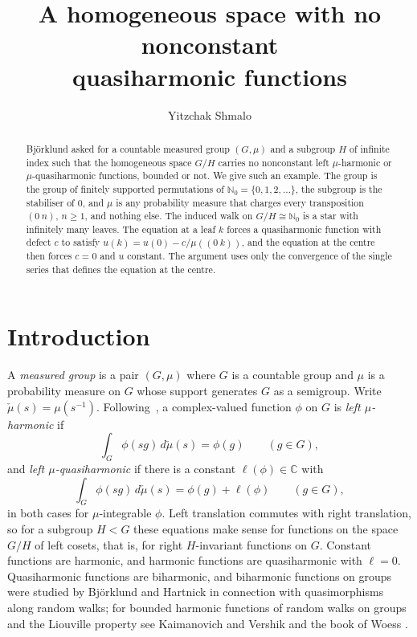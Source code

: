 \documentclass[11pt]{amsart}
\title[No nonconstant quasiharmonic functions on a homogeneous space]{A homogeneous space with no nonconstant\\ quasiharmonic functions}
\author{Yitzchak Shmalo}
\theoremstyle{definition}
\theoremstyle{remark}
\newcommand{\N}{\mathbb N}
\newcommand{\C}{\mathbb C}
\begin{document}
\begin{abstract}
Bj\"orklund asked for a countable measured group $(G,\mu)$ and a subgroup $H$ of infinite index such that the homogeneous space $G/H$ carries no nonconstant left $\mu$-harmonic or $\mu$-quasiharmonic functions, bounded or not. We give such an example. The group is the group of finitely supported permutations of $\N_0=\{0,1,2,\dots\}$, the subgroup is the stabiliser of $0$, and $\mu$ is any probability measure that charges every transposition $(0\ n)$, $n\ge1$, and nothing else. The induced walk on $G/H\cong\N_0$ is a star with infinitely many leaves. The equation at a leaf $k$ forces a quasiharmonic function with defect $c$ to satisfy $u(k)=u(0)-c/\mu((0\ k))$, and the equation at the centre then forces $c=0$ and $u$ constant. The argument uses only the convergence of the single series that defines the equation at the centre.
\end{abstract}

\maketitle

\section{Introduction}

A \emph{measured group} is a pair $(G,\mu)$ where $G$ is a countable group and $\mu$ is a probability measure on $G$ whose support generates $G$ as a semigroup. Write $\check\mu(s)=\mu(s^{-1})$. Following~\cite[Sections~1 and~4.1]{Bj}, a complex-valued function $\phi$ on $G$ is \emph{left $\mu$-harmonic} if
\begin{equation}\label{eq:harm}
\int_G \phi(sg)\,d\check\mu(s)=\phi(g)\qquad(g\in G),
\end{equation}
and \emph{left $\mu$-quasiharmonic} if there is a constant $\ell(\phi)\in\C$ with
\begin{equation}\label{eq:qharm}
\int_G \phi(sg)\,d\check\mu(s)=\phi(g)+\ell(\phi)\qquad(g\in G),
\end{equation}
in both cases for $\mu$-integrable $\phi$. Left translation commutes with right translation, so for a subgroup $H<G$ these equations make sense for functions on the space $G/H$ of left cosets, that is, for right $H$-invariant functions on $G$. Constant functions are harmonic, and harmonic functions are quasiharmonic with $\ell=0$. Quasiharmonic functions are biharmonic, and biharmonic functions on groups were studied by Bj\"orklund and Hartnick \cite{BH} in connection with quasimorphisms along random walks; for bounded harmonic functions of random walks on groups and the Liouville property see Kaimanovich and Vershik \cite{KV} and the book of Woess \cite{Woe}.
\end{document}
